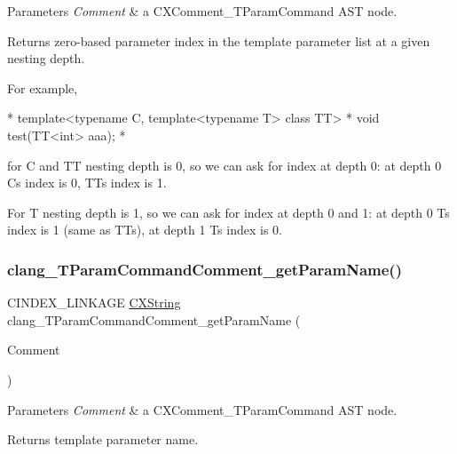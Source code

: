 \begin{DoxyParams}{Parameters}
{\em Comment} & a {\ttfamily C\+X\+Comment\+\_\+\+T\+Param\+Command} A\+ST node.\\
\hline
\end{DoxyParams}
\begin{DoxyReturn}{Returns}
zero-\/based parameter index in the template parameter list at a given nesting depth.
\end{DoxyReturn}
For example, \begin{DoxyVerb}*     template<typename C, template<typename T> class TT>
*     void test(TT<int> aaa);
* \end{DoxyVerb}
 for C and TT nesting depth is 0, so we can ask for index at depth 0\+: at depth 0 C\textquotesingle{}s index is 0, TT\textquotesingle{}s index is 1.

For T nesting depth is 1, so we can ask for index at depth 0 and 1\+: at depth 0 T\textquotesingle{}s index is 1 (same as TT\textquotesingle{}s), at depth 1 T\textquotesingle{}s index is 0. \mbox{\label{group__CINDEX__COMMENT_ga01f61f1d0dabcaf806eb1b9f21e5e340}} 
\subsubsection{\texorpdfstring{clang\+\_\+\+T\+Param\+Command\+Comment\+\_\+get\+Param\+Name()}{clang\_TParamCommandComment\_getParamName()}}
{\footnotesize\ttfamily C\+I\+N\+D\+E\+X\+\_\+\+L\+I\+N\+K\+A\+GE \mbox{\hyperlink{structCXString}{C\+X\+String}} clang\+\_\+\+T\+Param\+Command\+Comment\+\_\+get\+Param\+Name (\begin{DoxyParamCaption}\item[{\mbox{\hyperlink{structCXComment}{C\+X\+Comment}}}]{Comment }\end{DoxyParamCaption})}


\begin{DoxyParams}{Parameters}
{\em Comment} & a {\ttfamily C\+X\+Comment\+\_\+\+T\+Param\+Command} A\+ST node.\\
\hline
\end{DoxyParams}
\begin{DoxyReturn}{Returns}
template parameter name. 
\end{DoxyReturn}
\mbox{\label{group__CINDEX__COMMENT_ga1f6e7538a646824f3dde65d634de753f}} 
